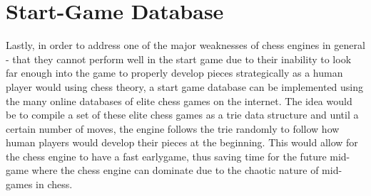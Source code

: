 \section{Start-Game Database}
Lastly, in order to address one of the major weaknesses of chess engines in general - that they cannot perform well in the start game due to their inability to look far enough into the game to properly develop pieces strategically as a human player would using chess theory, a start game database can be implemented using the many online databases of elite chess games on the internet. The idea would be to compile a set of these elite chess games as a trie data structure and until a certain number of moves, the engine follows the trie randomly to follow how human players would develop their pieces at the beginning. This would allow for the chess engine to have a fast earlygame, thus saving time for the future mid-game where the chess engine can dominate due to the chaotic nature of mid-games in chess.